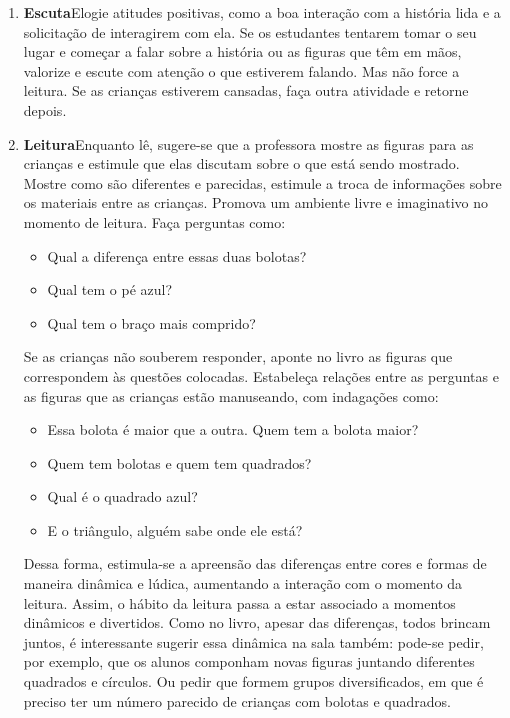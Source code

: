 \documentclass[11pt]{extarticle}
\begin{document}
\begin{enumerate}
\item \textbf{Escuta}\quad Elogie atitudes positivas, como 
a boa interação com a história lida e a solicitação de interagirem com ela. Se os estudantes tentarem 
tomar o seu lugar e começar a falar sobre a história ou as figuras que têm em mãos, valorize e escute com atenção o que estiverem falando. Mas não 
force a leitura. Se as crianças estiverem cansadas, faça outra atividade 
e retorne depois. 

\item \textbf{Leitura}\quad Enquanto lê, sugere-se que a professora mostre as figuras para as crianças e estimule que elas discutam sobre o que está sendo mostrado.
Mostre como são diferentes e parecidas, estimule a troca de informações sobre os materiais entre as crianças. Promova um ambiente livre e imaginativo no momento de leitura. 
Faça perguntas como:

\begin{itemize}
\item Qual a diferença entre essas duas bolotas?
\item Qual tem o pé azul?
\item Qual tem o braço mais comprido?
\end{itemize}

Se as crianças não souberem responder, aponte no livro as figuras que correspondem às questões colocadas. Estabeleça relações entre as perguntas e as figuras que as crianças estão manuseando, com indagações como:

\begin{itemize}
\item Essa bolota é maior que a outra. Quem tem a bolota maior?
\item Quem tem bolotas e quem tem quadrados?
\item Qual é o quadrado azul?
\item E o triângulo, alguém sabe onde ele está?
\end{itemize}

Dessa forma, estimula-se a apreensão das diferenças entre cores e formas de maneira dinâmica e lúdica, aumentando a interação com o momento da leitura. Assim, o hábito da leitura passa a estar associado a momentos dinâmicos e divertidos.
Como no livro, apesar das diferenças, todos brincam juntos, é interessante sugerir essa dinâmica na sala também: pode-se pedir, por exemplo, que os alunos componham novas figuras juntando diferentes quadrados e círculos. Ou pedir que formem grupos diversificados, em que é preciso ter um número parecido de crianças com bolotas e quadrados. 



\end{enumerate}
\end{document}
